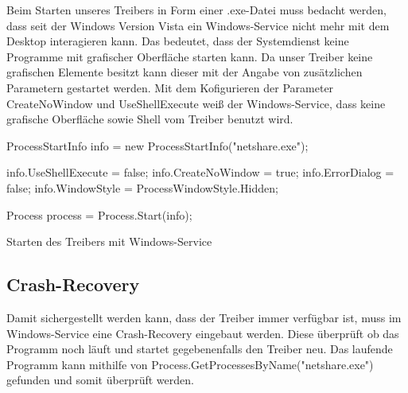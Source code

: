 Beim Starten unseres Treibers in Form einer .exe-Datei muss bedacht werden, dass seit der Windows Version Vista ein Windows-Service nicht mehr mit dem Desktop interagieren kann. Das bedeutet, dass der Systemdienst keine Programme mit grafischer Oberfläche starten kann. Da unser Treiber keine grafischen Elemente besitzt kann dieser mit der Angabe von zusätzlichen Parametern gestartet werden.
Mit dem Kofigurieren der Parameter CreateNoWindow und UseShellExecute weiß der Windows-Service, dass keine grafische Oberfläche sowie Shell vom Treiber benutzt wird.

\begin{program}[H]
\begin{CSharpCode}
ProcessStartInfo info = new ProcessStartInfo("netshare.exe");

info.UseShellExecute = false;
info.CreateNoWindow = true;
info.ErrorDialog = false;
info.WindowStyle = ProcessWindowStyle.Hidden;

Process process = Process.Start(info);
\end{CSharpCode}
\caption{Starten des Treibers mit Windows-Service}
\end{program}

\subsection{Crash-Recovery}

Damit sichergestellt werden kann, dass der Treiber immer verfügbar ist, muss im Windows-Service eine Crash-Recovery eingebaut werden. Diese überprüft ob das Programm noch läuft und startet gegebenenfalls den Treiber neu. Das laufende Programm kann mithilfe von \mbox{Process.GetProcessesByName("netshare.exe")} gefunden und somit überprüft werden.